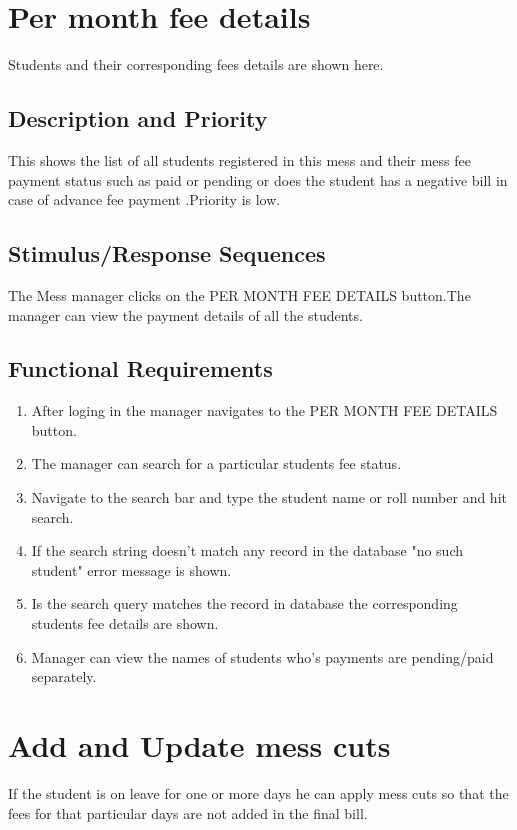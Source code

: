 \documentclass{scrreprt}
\begin{document}
\section{Per month fee details}
Students and their corresponding fees details are shown here.


\subsection{Description and Priority}
This shows the list of all students registered in this mess and their mess fee payment status such as paid or pending or does the student has a negative bill in case of advance fee payment .Priority is low.

\subsection{Stimulus/Response Sequences}
The Mess manager clicks on the PER MONTH FEE DETAILS button.The manager can view the payment details of all the students.

\subsection{Functional Requirements}
\begin{enumerate}
\item After loging in the manager navigates to the PER MONTH FEE DETAILS  button.
\item The manager can search for a particular students fee status.  
\item Navigate to the search bar and type the student name or roll number and hit search.
\item If the search string doesn't match any record in the database "no such student" error message is shown.
\item Is the search query matches the record in database the corresponding students fee details are shown. 
\item Manager can view the names of students who's payments are pending/paid separately.
\end{enumerate}

\section{Add and Update mess cuts}
If the student is on leave for one or more days he can apply mess cuts so that the fees for that particular days are not added in the final bill.
\end{document}

